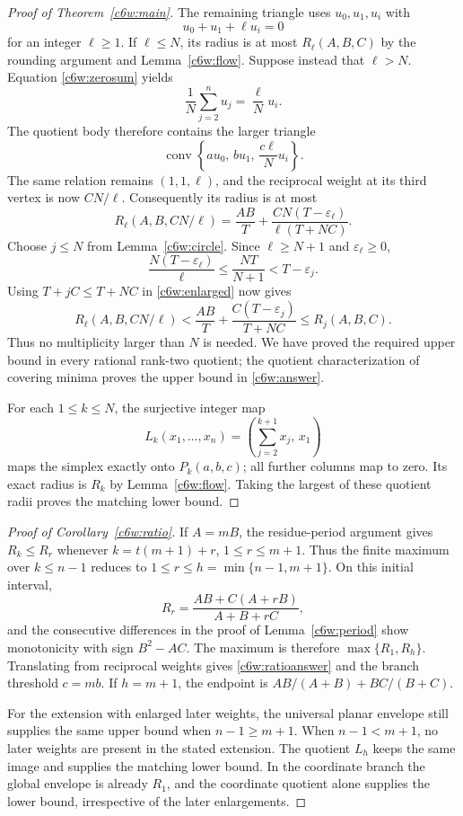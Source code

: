 \documentclass[11pt,a4paper]{article}
\theoremstyle{remark}\newtheorem{remark}[theorem]{Remark}
\DeclareMathOperator{\conv}{conv}
\begin{document}
\begin{proof}[Proof of Theorem~\ref{c6w:main}]
The remaining triangle uses $u_0,u_1,u_i$ with
\[
 u_0+u_1+\ell u_i=0
\]
for an integer $\ell\ge1$.  If $\ell\le N$, its radius is at
most $R_\ell(A,B,C)$ by the rounding argument and
Lemma~\ref{c6w:flow}.  Suppose instead that $\ell>N$.
Equation \eqref{c6w:zerosum} yields
\[
 \frac1N\sum_{j=2}^n u_j=\frac\ell N u_i.
\]
The quotient body therefore contains the larger triangle
\[
 \conv\left\{a u_0,\,b u_1,\,\frac{c\ell}{N}u_i\right\}.
\]
The same relation remains $(1,1,\ell)$, and the reciprocal
weight at its third vertex is now $CN/\ell$.  Consequently
its radius is at most
\begin{equation}\label{c6w:enlarged}
 R_\ell(A,B,CN/\ell)
 =\frac{AB}{T}
  +\frac{CN(T-\varepsilon_\ell)}{\ell(T+NC)}.
\end{equation}
Choose $j\le N$ from Lemma~\ref{c6w:circle}.  Since
$\ell\ge N+1$ and $\varepsilon_\ell\ge0$,
\[
 \frac{N(T-\varepsilon_\ell)}\ell
 \le\frac{NT}{N+1}
 <T-\varepsilon_j.
\]
Using $T+jC\le T+NC$ in \eqref{c6w:enlarged} now gives
\[
 R_\ell(A,B,CN/\ell)
 <\frac{AB}{T}+\frac{C(T-\varepsilon_j)}{T+NC}
 \le R_j(A,B,C).
\]
Thus no multiplicity larger than $N$ is needed.  We have proved
the required upper bound in every rational rank-two quotient;
the quotient characterization of covering minima proves the
upper bound in \eqref{c6w:answer}.

For each $1\le k\le N$, the surjective integer map
\[
 L_k(x_1,\ldots,x_n)
 =\left(\sum_{j=2}^{k+1}x_j,\,x_1\right)
\]
maps the simplex exactly onto $P_k(a,b,c)$; all further columns
map to zero.  Its exact radius is $R_k$ by
Lemma~\ref{c6w:flow}.  Taking the largest of these quotient
radii proves the matching lower bound.
\end{proof}

\begin{proof}[Proof of Corollary~\ref{c6w:ratio}]
If $A=mB$, the residue-period argument gives $R_k\le R_r$
whenever $k=t(m+1)+r$, $1\le r\le m+1$.
Thus the finite maximum over $k\le n-1$ reduces to
$1\le r\le h=\min\{n-1,m+1\}$.  On this initial interval,
\[
 R_r=\frac{AB+C(A+rB)}{A+B+rC},
\]
and the consecutive differences in the proof of
Lemma~\ref{c6w:period} show monotonicity with sign $B^2-AC$.
The maximum is therefore $\max\{R_1,R_h\}$.  Translating from
reciprocal weights gives \eqref{c6w:ratioanswer} and the branch
threshold $c=mb$.  If $h=m+1$, the endpoint is
$AB/(A+B)+BC/(B+C)$.

For the extension with enlarged later weights, the universal
planar envelope still supplies the same upper bound when
$n-1\ge m+1$.  When $n-1<m+1$, no later weights are present
in the stated extension.  The quotient $L_h$ keeps the same
image and supplies the matching lower bound.  In the coordinate
branch the global envelope is already $R_1$, and the coordinate
quotient alone supplies the lower bound, irrespective of the
later enlargements.
\end{proof}
\end{document}

